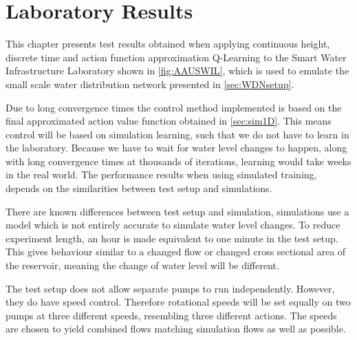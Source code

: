 \chapter{Laboratory Results}\label{chap:Results}
This chapter presents test results obtained when applying continuous height, discrete time and action function approximation Q-Learning to the Smart Water Infrastructure Laboratory shown in \cref{fig:AAUSWIL}, which is used to emulate the small scale water distribution network presented in \cref{sec:WDNsetup}.

Due to long convergence times the control method implemented is based on the final approximated action value function obtained in \cref{sec:sim1D}. This means control will be based on simulation learning, such that we do not have to learn in the laboratory. Because we have to wait for water level changes to happen, along with long convergence times at thousands of iterations, learning would take weeks in the real world. The performance results when using simulated training, depends on the similarities between test setup and simulations.

There are known differences between test setup and simulation, simulations use a model which is not entirely accurate to simulate water level changes. To reduce experiment length, an hour is made equivalent to one minute in the test setup. This gives behaviour similar to a changed flow or changed cross sectional area of the reservoir, meaning the change of water level will be different.

The test setup does not allow separate pumps to run independently. However, they do have speed control. Therefore rotational speeds will be set equally on two pumps at three different speeds, resembling three different actions. The speeds are chosen to yield combined flows matching simulation flows as well as possible.

